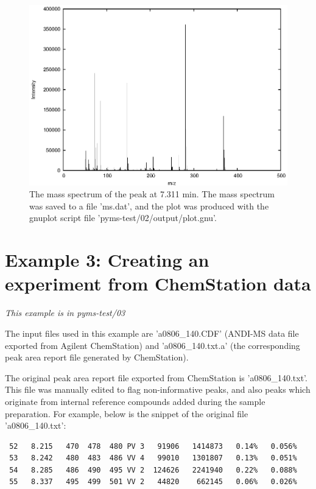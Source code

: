 \begin{figure}[htp]
\begin{center}
\includegraphics{graphics/pyms-test/ms.eps}
\caption{The mass spectrum of the peak at 7.311 min. The mass spectrum was
saved to a file 'ms.dat', and the plot was produced with the gnuplot script
file 'pyms-test/02/output/plot.gnu'.}
\label{fig:mass-spectrum}
\end{center}
\end{figure}

\section{Example 3: Creating an experiment from ChemStation data}

\noindent
{\em This example is in pyms-test/03}

The input files used in this example are 'a0806\_140.CDF' (ANDI-MS data
file exported from Agilent ChemStation) and 'a0806\_140.txt.a' (the 
corresponding peak area report file generated by ChemStation).

The original peak area report file exported from ChemStation is
'a0806\_140.txt'. This file was manually edited to flag non-informative
peaks, and also peaks which originate from internal reference compounds
added during the sample preparation. For example, below is the snippet
of the original file 'a0806\_140.txt':

\begin{verbatim}
 52   8.215   470  478  480 PV 3   91906   1414873   0.14%   0.056%
 53   8.242   480  483  486 VV 4   99010   1301807   0.13%   0.051%
 54   8.285   486  490  495 VV 2  124626   2241940   0.22%   0.088%
 55   8.337   495  499  501 VV 2   44820    662145   0.06%   0.026%
\end{verbatim}

